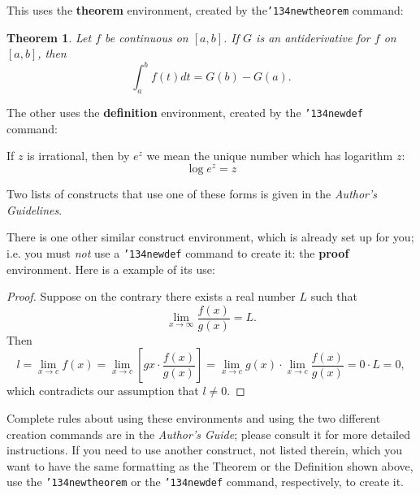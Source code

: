\documentclass{sig-alternate-05-2015}
\begin{document}
This uses the \textbf{theorem} environment, created by
the\linebreak\texttt{{\char'134}newtheorem} command:
\newtheorem{theorem}{Theorem}
\begin{theorem}
Let $f$ be continuous on $[a,b]$.  If $G$ is
an antiderivative for $f$ on $[a,b]$, then
\begin{displaymath}\int^b_af(t)dt = G(b) - G(a).\end{displaymath}
\end{theorem}

The other uses the \textbf{definition} environment, created
by the \texttt{{\char'134}newdef} command:
\begin{definition}
If $z$ is irrational, then by $e^z$ we mean the
unique number which has
logarithm $z$: \begin{displaymath}{\log e^z = z}\end{displaymath}
\end{definition}

Two lists of constructs that use one of these
forms is given in the
\textit{Author's  Guidelines}.
 
There is one other similar construct environment, which is
already set up
for you; i.e. you must \textit{not} use
a \texttt{{\char'134}newdef} command to
create it: the \textbf{proof} environment.  Here
is a example of its use:
\begin{proof}
Suppose on the contrary there exists a real number $L$ such that
\begin{displaymath}
\lim_{x\rightarrow\infty} \frac{f(x)}{g(x)} = L.
\end{displaymath}
Then
\begin{displaymath}
l=\lim_{x\rightarrow c} f(x)
= \lim_{x\rightarrow c}
\left[ g{x} \cdot \frac{f(x)}{g(x)} \right ]
= \lim_{x\rightarrow c} g(x) \cdot \lim_{x\rightarrow c}
\frac{f(x)}{g(x)} = 0\cdot L = 0,
\end{displaymath}
which contradicts our assumption that $l\neq 0$.
\end{proof}

Complete rules about using these environments and using the
two different creation commands are in the
\textit{Author's Guide}; please consult it for more
detailed instructions.  If you need to use another construct,
not listed therein, which you want to have the same
formatting as the Theorem
or the Definition\cite{salas:calculus} shown above,
use the \texttt{{\char'134}newtheorem} or the
\texttt{{\char'134}newdef} command,
respectively, to create it.
\end{document}
